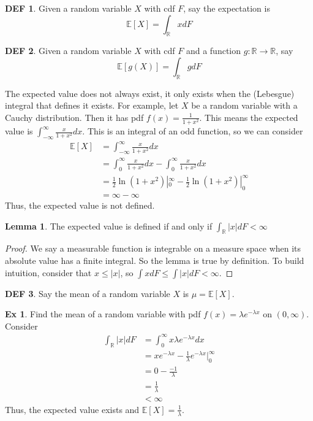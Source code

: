 \documentclass{article}
\theoremstyle{definition}\newtheorem{definition}{DEF}
\theoremstyle{definition}\newtheorem{example}{Ex}
\theoremstyle{lemma}\newtheorem{lemma}{Lemma}
\theoremstyle{corrolary}\newtheorem{corrolary}{Cor}
\begin{document}
\begin{definition}
Given a random variable $X$ with cdf $F$, say the expectation is
\begin{equation}
\mathbb{E}[X] = \int_\mathbb{R} x dF
\end{equation}
\end{definition}

\begin{definition}
Given a random variable $X$ with cdf $F$ and a function $g: \mathbb{R} \rightarrow \mathbb{R}$, say
\begin{equation}
\mathbb{E}[g(X)] = \int_\mathbb{R} g dF
\end{equation}
\end{definition}

The expected value does not always exist, it only exists when the (Lebesgue) integral that defines it exists.
For example, let $X$ be a random variable with a Cauchy distribution.
Then it has pdf $f(x)=\frac{1}{1+x^2}$.
This means the expected value is $\int_{-\infty}^\infty \frac{x}{1+x^2} dx$.
This is an integral of an odd function, so we can consider
\begin{align*}
\mathbb{E}[X] &= \int_{-\infty}^\infty \frac{x}{1+x^2} dx \\
&= \int_0^\infty \frac{x}{1+x^2} dx - \int_0^\infty \frac{x}{1+x^2} dx \\
&= \frac{1}{2} \ln (1+x^2) |_0^\infty - \frac{1}{2} \ln (1+x^2) |_0^\infty \\
&= \infty - \infty
\end{align*}
Thus, the expected value is not defined.

\begin{lemma}
The expected value is defined if and only if $\int_\mathbb{R} |x| dF < \infty$
\end{lemma}
\begin{proof}
We say a measurable function is integrable on a measure space when its absolute value has a finite integral.
So the lemma is true by definition.
To build intuition, consider that $x \leq |x|$, so $\int x dF \leq \int |x| dF < \infty$.
\end{proof}

\begin{definition}
Say the mean of a random variable $X$ is $\mu = \mathbb{E}[X]$.
\end{definition}

\begin{example}
Find the mean of a random variable with pdf $f(x) = \lambda e^{-\lambda x}$ on $(0,\infty)$.
Consider 
\begin{align*}
\int_\mathbb{R} |x| dF &= \int_0^\infty x\lambda e^{-\lambda x} dx \\
&= xe^{-\lambda x} - \frac{1}{\lambda} e^{-\lambda x} |_0^\infty \\
&= 0 - \frac{-1}{\lambda}\\
&= \frac{1}{\lambda}\\
&< \infty
\end{align*}
Thus, the expected value exists and $\mathbb{E}[X]=\frac{1}{\lambda}$.
\end{example}
\end{document}
